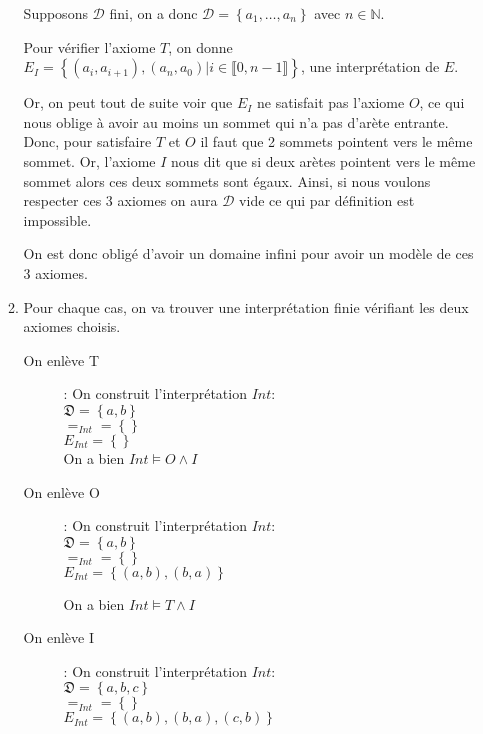 \documentclass{article}
\begin{document}
\begin{enumerate}
\begin{enumerate}
            Supposons $\mathcal{D}$ fini, on a donc $\mathcal{D} = \left\{a_1, \ldots, a_n\right\}$ 
            avec $n \in \mathbb{N}$.

            Pour vérifier l'axiome $T$, on donne $E_I = \left\{(a_i, a_{i+1}), (a_n, a_0) 
            | i \in \llbracket 0, n - 1\rrbracket\right\}$, une interprétation de $E$.

            Or, on peut tout de suite voir que $E_I$ ne satisfait pas l'axiome $O$, ce qui nous oblige 
            à avoir au moins un sommet qui n'a pas d'arète entrante. Donc, pour 
            satisfaire $T$ et $O$ il faut que 2 sommets pointent vers le même sommet.
            Or, l'axiome $I$ nous dit que si deux arètes pointent vers le même sommet alors ces 
            deux sommets sont égaux. Ainsi, si nous voulons respecter ces 3 axiomes on aura $\mathcal{D}$ vide
            ce qui par définition est impossible.

            On est donc obligé d'avoir un domaine infini pour avoir un modèle de ces 3 axiomes.
        \item Pour chaque cas, on va trouver une interprétation finie vérifiant les deux axiomes choisis.
        \begin{description}
            \item[On enlève T]: On construit l'interprétation $Int$:\\
                $\mathfrak{D} = \left\{a, b\right\}$\\
                $=_{Int} = \left\{\right\} $\\
                $E_{Int} = \left\{\right\}$\\
                On a bien $Int \models O \wedge I$

            \item[On enlève O]: On construit l'interprétation $Int$:\\
                $\mathfrak{D} = \left\{a, b\right\}$\\
                $=_{Int} = \left\{\right\} $\\
                $E_{Int} = \left\{(a, b), (b, a)\right\}$


                On a bien $Int \models T \wedge I$

            \item[On enlève I]: On construit l'interprétation $Int$:\\
                $\mathfrak{D} = \left\{a, b, c\right\}$\\
                $=_{Int} = \left\{\right\} $\\
                $E_{Int} = \left\{(a, b), (b, a), (c, b)\right\}$


\end{description}
\end{enumerate}
\end{enumerate}
\end{document}
